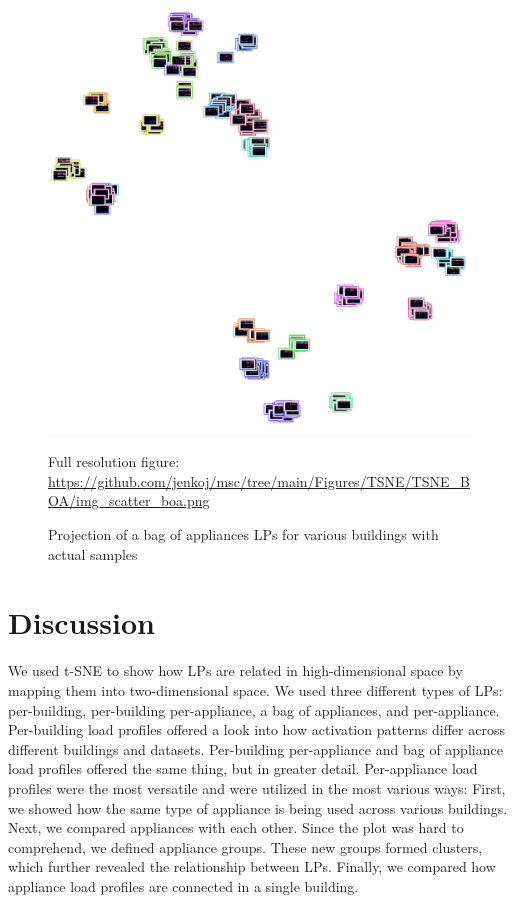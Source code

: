 \begin{figure}[H]
	\centering
	\caption{Projection of a bag of appliances LPs for various buildings with actual samples}
	\includegraphics[width=.9\textwidth]{Figures/TSNE/TSNE_BOA/img_scatter_boa.png}
	\label{fig:tsne_boa_img_scatter_refit8}
	\par
	\par\footnotesize{Full resolution figure: \url{https://github.com/jenkoj/msc/tree/main/Figures/TSNE/TSNE_BOA/img_scatter_boa.png}}
\end{figure}

\section{Discussion}

We used t-SNE to show how LPs are related in high-dimensional space by mapping them into two-dimensional space.
We used three different types of LPs: per-building, per-building per-appliance, a bag of appliances, and per-appliance.
Per-building load profiles offered a look into how activation patterns differ across different buildings and datasets.
Per-building per-appliance and bag of appliance load profiles offered the same thing, but in greater detail.
Per-appliance load profiles were the most versatile and were utilized in the most various ways:
First, we showed how the same type of appliance is being used across various buildings.
Next, we compared appliances with each other.
Since the plot was hard to comprehend, we defined appliance groups.
These new groups formed clusters, which further revealed the relationship between LPs.
Finally, we compared how appliance load profiles are connected in a single building.

